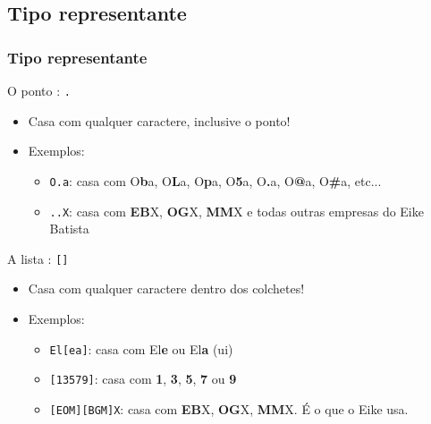 \documentclass{beamer}
\begin{document}
\subsection{Tipo representante}
\begin{frame}
 \frametitle{Tipo representante}
 \begin{block}{O ponto : \texttt{.}}
  \begin{itemize}
   \item Casa com qualquer caractere, inclusive o ponto!
	\pause
   \item Exemplos:
	\begin{itemize}
	 \item \texttt{O.a}: casa com O\textbf{b}a, O\textbf{L}a, O\textbf{p}a, O\textbf{5}a, O\textbf{.}a, O\textbf{@}a, O\textbf{\#}a, etc...
	  \pause
	 \item \texttt{..X}: casa com \textbf{EB}X, \textbf{OG}X, \textbf{MM}X e todas outras empresas do Eike Batista
	\end{itemize}
  \end{itemize}
 \end{block}

 \pause
 \begin{block}{A lista : \texttt{[]}}
  \begin{itemize}
   \item Casa com qualquer caractere dentro dos colchetes!
	\pause
   \item Exemplos:
	\begin{itemize}
	 \item \texttt{El[ea]}: casa com El\textbf{e} ou El\textbf{a} (ui)
	  \pause
	 \item \texttt{[13579]}: casa com \textbf{1}, \textbf{3}, \textbf{5}, \textbf{7} ou \textbf{9}
	  \pause
	 \item \texttt{[EOM][BGM]X}: casa com \textbf{EB}X, \textbf{OG}X, \textbf{MM}X. É o que o Eike usa.
	\end{itemize}
  \end{itemize}
 \end{block}
\end{frame}
\end{document}
